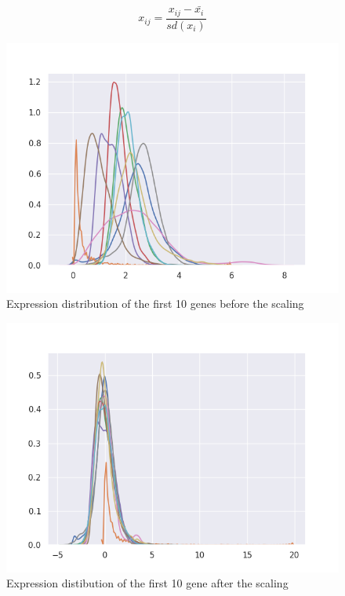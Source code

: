 \begin{equation}
    x_{ij} = \frac{x_{ij}-\bar{x_{i}}}{sd(x_{i})}
    \label{eq:std}
\end{equation}

\begin{figure}
    \centering
    \includegraphics[width=0.8\linewidth]{images/norm_expr_genes.png}
    \caption[]{Expression distribution of the first 10 genes before the scaling}
    \label{fig:norm_expr_genes}
\end{figure}

\begin{figure}
    \centering
    \includegraphics[width=0.8\linewidth]{images/scaled_expr_genes.png}
    \caption{Expression distibution of the first 10 gene after the scaling}
    \label{fig:scaled_expr_genes}
\end{figure}

\newpage
